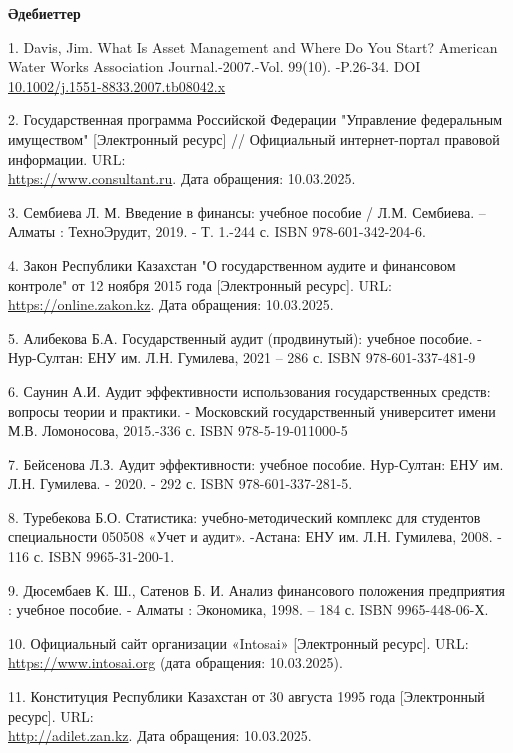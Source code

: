 \begin{center}
{\bfseries Әдебиеттер}
\end{center}

\begin{references}
1. Davis, Jim. What Is Asset Management and Where Do You Start? American
Water Works Association Journal.-2007.-Vol. 99(10). -P.26-34. DOI
\href{http://dx.doi.org/10.1002/j.1551-8833.2007.tb08042.x}{10.1002/j.1551-8833.2007.tb08042.x}

2. Государственная программа Российской Федерации "Управление федеральным
имуществом" {[}Электронный ресурс{]} // Официальный интернет-портал
правовой информации. URL:\\
\href{https://www.consultant.ru/document/cons\_doc\_LAW\_155198/}{https://www.consultant.ru}. Дата
обращения: 10.03.2025.

3. Сембиева Л. М. Введение в финансы: учебное пособие / Л.М. Сембиева. --
Алматы : ТехноЭрудит, 2019. - Т. 1.-244 с. ISBN 978-601-342-204-6.

4. Закон Республики Казахстан "О государственном аудите и финансовом
контроле" от 12 ноября 2015 года {[}Электронный ресурс{]}. URL:
\href{https://online.zakon.kz/document/?doc_id=37724730}{https://online.zakon.kz}. Дата
обращения: 10.03.2025.

5. Алибекова Б.А. Государственный аудит (продвинутый): учебное пособие. -
Нур-Султан: ЕНУ им. Л.Н. Гумилева, 2021 -- 286 с. ISBN
978-601-337-481-9

6. Саунин А.И. Аудит эффективности использования государственных средств:
вопросы теории и практики. - Московский государственный университет
имени М.В. Ломоносова, 2015.-336 с. ISBN 978-5-19-011000-5

7. Бейсенова Л.З. Аудит эффективности: учебное пособие. Нур-Султан: ЕНУ
им. Л.Н. Гумилева. - 2020. - 292 с. ISBN 978-601-337-281-5.

8. Туребекова Б.О. Статистика: учебно-методический комплекс для студентов
специальности 050508 «Учет и аудит». -Астана: ЕНУ им. Л.Н. Гумилева,
2008. - 116 с. ISBN 9965-31-200-1.

9. Дюсембаев К. Ш., Сатенов Б. И. Анализ финансового положения
предприятия : учебное пособие. - Алматы : Экономика, 1998. -- 184 с.
ISBN 9965-448-06-Х.

10. Официальный сайт организации «Intosai» {[}Электронный ресурс{]}. URL:
\href{https://www.intosai.org}{https://www.intosai.org} (дата обращения: 10.03.2025).

11. Конституция Республики Казахстан от 30 августа 1995 года
{[}Электронный ресурс{]}. URL:\\
\href{http://adilet.zan.kz/rus/docs/K950001000_\#z42}{http://adilet.zan.kz}. Дата обращения:
10.03.2025.


\end{references}
